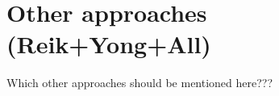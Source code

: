 \section{Other approaches {\bf{(Reik+Yong+All)}}}

Which other approaches should be mentioned here???